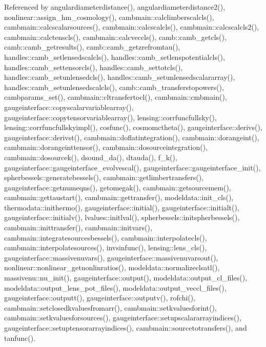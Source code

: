 Referenced by angulardiameterdistance(), angulardiameterdistance2(), nonlinear\+::assign\+\_\+hm\+\_\+cosmology(), cambmain\+::calclimberscalcls(), cambmain\+::calcscalarsources(), cambmain\+::calcscalcls(), cambmain\+::calcscalcls2(), cambmain\+::calctenscls(), cambmain\+::calcveccls(), camb\+::camb\+\_\+getcls(), camb\+::camb\+\_\+getresults(), camb\+::camb\+\_\+getzrefromtau(), handles\+::camb\+\_\+setlensedscalcls(), handles\+::camb\+\_\+setlenspotentialcls(), handles\+::camb\+\_\+settensorcls(), handles\+::camb\+\_\+settotcls(), handles\+::camb\+\_\+setunlensedcls(), handles\+::camb\+\_\+setunlensedscalararray(), handles\+::camb\+\_\+setunlensedscalcls(), camb\+::camb\+\_\+transferstopowers(), cambparams\+\_\+set(), cambmain\+::cltransfertocl(), cambmain\+::cmbmain(), gaugeinterface\+::copyscalarvariablearray(), gaugeinterface\+::copytensorvariablearray(), lensing\+::corrfuncfullsky(), lensing\+::corrfuncfullskyimpl(), cosfunc(), cosmomctheta(), gaugeinterface\+::derivs(), gaugeinterface\+::derivst(), cambmain\+::doflatintegration(), cambmain\+::dorangeint(), cambmain\+::dorangeinttensor(), cambmain\+::dosourceintegration(), cambmain\+::dosourcek(), dsound\+\_\+da(), dtauda(), f\+\_\+k(), gaugeinterface\+::gaugeinterface\+\_\+evolvescal(), gaugeinterface\+::gaugeinterface\+\_\+init(), spherbessels\+::generatebessels(), cambmain\+::getlimbertransfers(), gaugeinterface\+::getnumeqns(), getomegak(), cambmain\+::getsourcemem(), cambmain\+::gettaustart(), cambmain\+::gettransfer(), modeldata\+::init\+\_\+cls(), thermodata\+::inithermo(), gaugeinterface\+::initial(), gaugeinterface\+::initialt(), gaugeinterface\+::initialv(), lvalues\+::initlval(), spherbessels\+::initspherbessels(), cambmain\+::inittransfer(), cambmain\+::initvars(), cambmain\+::integratesourcesbessels(), cambmain\+::interpolatecls(), cambmain\+::interpolatesources(), invsinfunc(), lensing\+::lens\+\_\+cls(), gaugeinterface\+::massivenuvars(), gaugeinterface\+::massivenuvarsout(), nonlinear\+::nonlinear\+\_\+getnonlinratios(), modeldata\+::normalizeclsatl(), massivenu\+::nu\+\_\+init(), gaugeinterface\+::output(), modeldata\+::output\+\_\+cl\+\_\+files(), modeldata\+::output\+\_\+lens\+\_\+pot\+\_\+files(), modeldata\+::output\+\_\+veccl\+\_\+files(), gaugeinterface\+::outputt(), gaugeinterface\+::outputv(), rofchi(), cambmain\+::setclosedkvaluesfromarr(), cambmain\+::setkvaluesforint(), cambmain\+::setkvaluesforsources(), gaugeinterface\+::setupscalararrayindices(), gaugeinterface\+::setuptensorarrayindices(), cambmain\+::sourcetotransfers(), and tanfunc().

